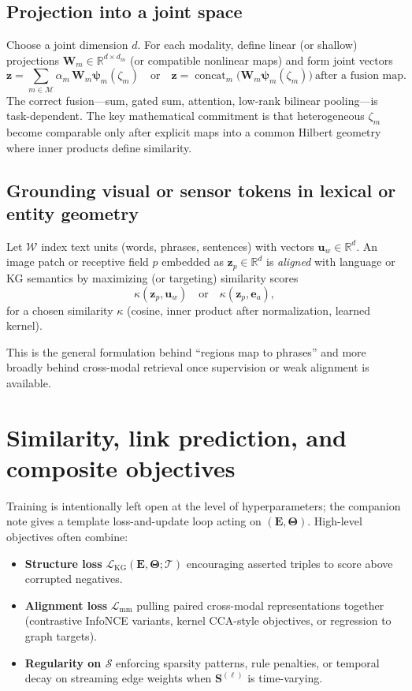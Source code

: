\documentclass[11pt]{article}
\begin{document}
\subsection{Projection into a joint space}
Choose a joint dimension $d$.
For each modality, define linear (or shallow) projections $\bm{W}_m \in \mathbb{R}^{d \times d_m}$ (or compatible nonlinear maps) and form joint vectors
\begin{equation}
  \bm{z} = \sum_{m \in \mathcal{M}} \alpha_m \, \bm{W}_m \bm{\psi}_m(\zeta_m) \quad \text{or} \quad
  \bm{z} = \operatorname{concat}_{m}\big( \bm{W}_m \bm{\psi}_m(\zeta_m) \big) \ \text{after a fusion map.}
\end{equation}
The correct fusion---sum, gated sum, attention, low-rank bilinear pooling---is task-dependent.
The key mathematical commitment is that heterogeneous $\zeta_m$ become comparable only after explicit maps into a common Hilbert geometry where inner products define similarity.

\subsection{Grounding visual or sensor tokens in lexical or entity geometry}
Let $\mathcal{W}$ index text units (words, phrases, sentences) with vectors $\bm{u}_w \in \mathbb{R}^d$.
An image patch or receptive field $p$ embedded as $\bm{z}_p \in \mathbb{R}^d$ is \emph{aligned} with language or KG semantics by maximizing (or targeting) similarity scores
\begin{equation}
  \kappa(\bm{z}_p, \bm{u}_w) \quad \text{or} \quad \kappa(\bm{z}_p, \bm{e}_a),
\end{equation}
for a chosen similarity $\kappa$ (cosine, inner product after normalization, learned kernel).

This is the general formulation behind ``regions map to phrases'' and more broadly behind cross-modal retrieval once supervision or weak alignment is available.

\section{Similarity, link prediction, and composite objectives}
Training is intentionally left open at the level of hyperparameters; the companion note \cite{ConstructionCompanion} gives a template loss-and-update loop acting on $(\bm{E}, \bm{\Theta})$.
High-level objectives often combine:
\begin{itemize}
  \item \textbf{Structure loss} $\mathcal{L}_{\mathrm{KG}}(\bm{E}, \bm{\Theta}; \mathcal{T})$ encouraging asserted triples to score above corrupted negatives.
  \item \textbf{Alignment loss} $\mathcal{L}_{\mathrm{mm}}$ pulling paired cross-modal representations together (contrastive InfoNCE variants, kernel CCA-style objectives, or regression to graph targets).
  \item \textbf{Regularity on $\mathcal{S}$} enforcing sparsity patterns, rule penalties, or temporal decay on streaming edge weights when $\bm{S}^{(\ell)}$ is time-varying.
\end{itemize}
\end{document}
